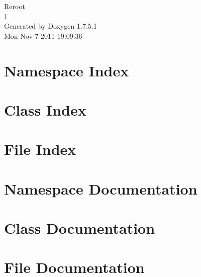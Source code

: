 \documentclass[a4paper]{book}
\begin{document}
\hypersetup{pageanchor=false,citecolor=blue}
\begin{titlepage}
\vspace*{7cm}
\begin{center}
{\Large \-Reroot \\[1ex]\large 1 }\\
\vspace*{1cm}
{\large \-Generated by Doxygen 1.7.5.1}\\
\vspace*{0.5cm}
{\small Mon Nov 7 2011 19:09:36}\\
\end{center}
\end{titlepage}
\clearemptydoublepage
{}
\tableofcontents
\clearemptydoublepage
{}
\hypersetup{pageanchor=true,citecolor=blue}
\chapter{\-Namespace \-Index}

\chapter{\-Class \-Index}

\chapter{\-File \-Index}

\chapter{\-Namespace \-Documentation}



\chapter{\-Class \-Documentation}





\chapter{\-File \-Documentation}





\printindex
\end{document}

